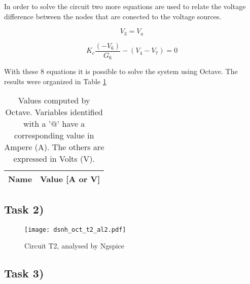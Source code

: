 In order to solve the circuit two more equations are used to relate the voltage difference between the nodes that 
are conected to the voltage sources.

\begin{equation}
	V_3 = V_a
	\label{}
\end{equation}

\begin{equation}
	K_c\frac{(-V_6)}{G_6}-(V_4-V_7)=0
	\label{}
\end{equation}


With these 8 equations it is possible to solve the system using Octave.
The results were organized in Table \ref{tab:node}

\begin{table}[ht]
	\centering
	\begin{tabular}{|l|r|}
    		\hline    
    		{\bf Name} & {\bf Value [A or V]} \\ \hline
    		
  	\end{tabular}
  	\caption{Values computed by Octave. Variables identified with a '$@$' have a
  	corresponding value in Ampere (A). The others are expressed in Volts (V).}
 
\label{tab:node}
\end{table}

\subsection{Task 2)}
\label{subsec:task2_a}

\begin{figure}[ht]
	\centering
	\texttt{[image: dsnh\_oct\_t2\_al2.pdf]}
	\caption{Circuit T2, analysed by Ngspice}
\label{fig:Dsnh_sim_t2}
\end{figure}

\subsection{Task 3)}
\label{subsec:task3_a}

